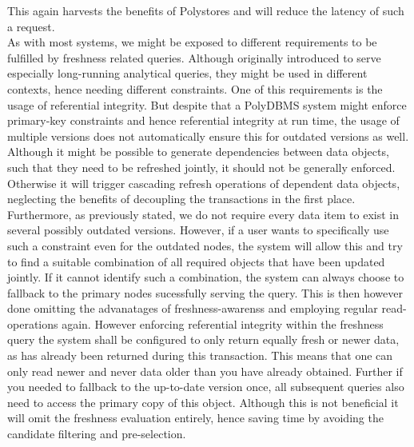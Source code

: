 This again harvests the benefits of Polystores and will reduce the latency of such a request.\\
As with most systems, we might be exposed to different requirements to be fulfilled by freshness related queries. 
Although originally introduced to serve especially long-running analytical queries, they might be used in different contexts, hence needing different constraints.
One of this requirements is the usage of referential integrity.
But despite that a PolyDBMS system might enforce primary-key constraints and hence referential integrity at run time, the usage of multiple versions does not automatically
ensure this for outdated versions as well. Although it might be possible to generate dependencies between data objects, such that they need to be refreshed jointly,
it should not be generally enforced. Otherwise it will trigger cascading refresh operations of dependent data objects, neglecting the benefits of decoupling the transactions 
in the first place. Furthermore, as previously stated, we do not require every data item to exist in several possibly outdated versions.  
However, if a user wants to specifically use such a constraint even for the outdated nodes, the system will allow this and try to find a suitable combination of all required 
objects that have been updated jointly. If it cannot identify such a combination, the system can always choose to fallback to the primary nodes sucessfully serving the query.
This is then however done omitting the advanatages of freshness-awarenss and employing regular read-operations again.
However enforcing referential integrity within the freshness query the system shall be configured to only return equally fresh or newer data, 
as has already been returned during this transaction. This means that one can only read newer and never data older than you have already obtained.
Further if you needed to fallback to the up-to-date version once, all subsequent queries also need to access the primary copy of this object. 
Although this is not beneficial it will omit the freshness evaluation entirely, hence saving time by avoiding the candidate filtering and pre-selection.

